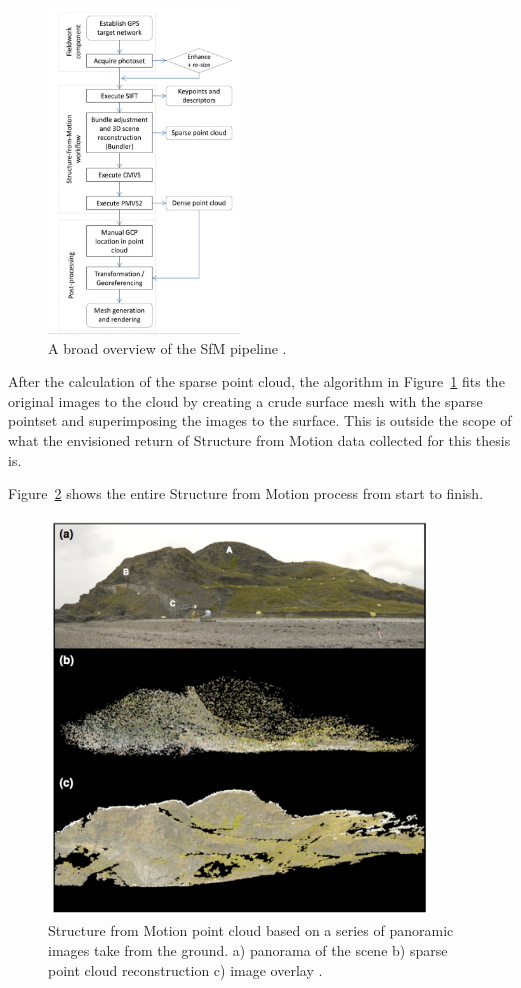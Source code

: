 \documentclass[12pt]{drexelthesis}
\begin{document}
\begin{figure}[!ht]
	\centering
	\includegraphics[width=2in]{instruments/sfmpipeline.png}
	\caption[Structure from Motion algorithm pipeline]{\centering A broad overview of the SfM pipeline \cite{WESTOBY2012300}.}
	\label{sfm:pipeline}
\end{figure}

After the calculation of the sparse point cloud, the algorithm in Figure~\ref{sfm:pipeline} fits the original images to the cloud by creating a crude surface mesh with the sparse pointset and superimposing the images to the surface. This is outside the scope of what the envisioned return of Structure from Motion data collected for this thesis is.

Figure~\ref{sfm:wholedeal} shows the entire Structure from Motion process from start to finish.

\begin{figure}[!ht]
	\centering
	\includegraphics[width=4in]{instruments/sfmresults.png}
	\caption[Structure from Motion results]{\centering Structure from Motion point cloud based on a series of panoramic images take from the ground. a) panorama of the scene b) sparse point cloud reconstruction c) image overlay \cite{WESTOBY2012300}.}
	\label{sfm:wholedeal}
\end{figure}
\end{document}
